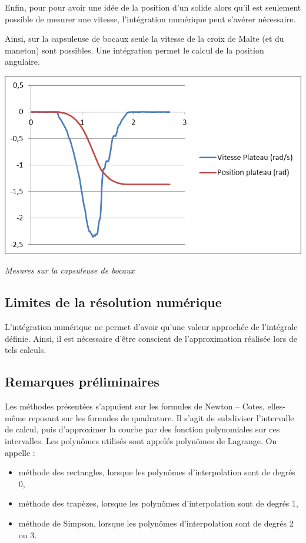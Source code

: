 \documentclass[10pt]{article}
\begin{document}
\begin{minipage}[c]{.47\linewidth}
Enfin, pour pour avoir une idée de la position d'un solide alors qu'il est seulement possible de mesurer une vitesse, l'intégration numérique peut s'avérer nécessaire.

Ainsi, sur la capsuleuse de bocaux seule la vitesse de la croix de Malte (et du maneton) sont possibles. Une intégration permet le calcul de la position angulaire.
\end{minipage}\hfill
\begin{minipage}[c]{.47\linewidth}
\begin{center}
\includegraphics[width=.95\textwidth]{images/capsuleuse}

\textit{Mesures sur la capsuleuse de bocaux}
\end{center}
\end{minipage}

\subsection{Limites de la résolution numérique}
\begin{warn}
L'intégration numérique ne permet d'avoir qu'une valeur approchée de l'intégrale définie. 
Ainsi, il est nécessaire d'être conscient de l'approximation réalisée lors de tels calculs.
\end{warn}

\subsection{Remarques préliminaires}

Les méthodes présentées s'appuient sur les formules de Newton -- Cotes, elles-même reposant sur les formules de quadrature. Il s'agit de subdiviser l'intervalle de calcul, puis d'approximer la courbe par des fonction polynomiales sur ces intervalles. Les polynômes utilisés sont appelés polynômes de Lagrange. On appelle :
\begin{itemize}
\item méthode des rectangles, lorsque les polynômes d'interpolation sont de degrés 0,
\item méthode des trapèzes, lorsque les polynômes d'interpolation sont de degrés 1,
\item méthode de Simpson, lorsque les polynômes d'interpolation sont de degrés 2 ou 3. 
\end{itemize}
\end{document}
